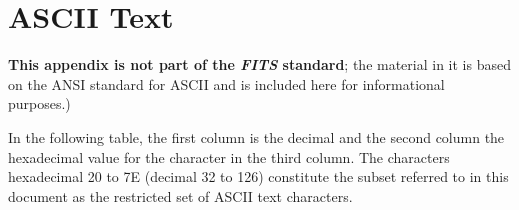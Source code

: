 \documentclass[11pt,makeidx]{book}     %
\begin{document}

\chapter{ASCII Text}
   \label{s:Atxt}

{\bf This appendix is not part of the {\em FITS\/} standard}; the 
material in it is based on the ANSI standard for ASCII \cite{ansi77} and is 
included here for informational purposes.)

In the following table, the first column is 
the decimal
and the second column the hexadecimal value for the character 
in the third column.  The characters hexadecimal 20 to 7E (decimal 32 
to 126) constitute the subset referred to in this document as the restricted
set of ASCII text characters. 
                                                                               
\end{document}
